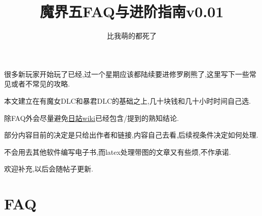 




\title{魔界五FAQ与进阶指南v0.01}
\author{比我萌的都死了}

\maketitle

很多新玩家开始玩了已经,过一个星期应该都陆续要进修罗刷熊了,这里写下一些常见或者不常见的攻略.

本文建立在有魔女DLC和暴君DLC的基础之上,几十块钱和几十小时时间自己选.

除FAQ外会尽量避免\href{http://wikinavi.net/disgaea5/index.php}{日站wiki}已经包含/提到的熟知结论.

部分内容目前的决定是只给出作者和链接,内容自己去看,后续视条件决定如何处理.

不会用去其他软件编写电子书,而latex处理带图的文章又有些烦,不作承诺.

欢迎补充,以后会随帖子更新.

\tableofcontents
\newpage



\newpage

\section{FAQ}


